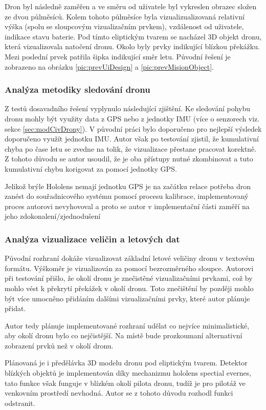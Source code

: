 Dron byl následně zaměřen a ve směru od uživatele byl vykreslen obrazec složen ze dvou půlměsíců. Kolem tohoto půlměsíce byla vizualizualizovaná relativní výška (spolu se sloupcovým vizualizačním prvkem), vzdálenost od uživatele, indikace stavu baterie. Pod tímto eliptickým tvarem se nacházel 3D objekt dronu, která vizualizovala natočení dronu. Okolo byly prvky indikující blízkou překážku. Mezi poslední prvek patřila šipka indikující směr letu. Původní řešení je zobrazeno na obrázku \ref{pic:prevUiDesign} a \ref{pic:prevMisionObject}.

\subsubsection{Analýza metodiky sledování dronu}
Z testů dosavadního řešení vyplynulo následující zjištění. Ke sledování pohybu dronu mohly být využity data z GPS nebo z jednotky IMU (více o senzorech viz. sekce \ref{sec:modCivDrony}). V původní práci bylo doporučeno pro nejlepší výsledek doporučeno využít jednotku IMU. Autor však po testování zjistil, že kumulativní chyba po čase letu se zvedne na tolik, že vizualizace přestane pracovat korektně. Z tohoto důvodu se autor usoudil, že je oba přístupy nutné zkombinovat a tuto kumulativní chybu korigovat za pomocí jednotky GPS.

Jelikož brýle Hololens nemají jednotku GPS je na začátku relace potřeba dron zanést do souřadnicového systému pomocí procesu kalibrace, implementovaný proces autorovi nevyhovoval a proto se autor v implementační části zaměří na jeho zdokonalení/zjednodušení
\subsubsection{Analýza  vizualizace veličin a letových dat}
Původní rozhraní dokáže vizualizovat základní letové veličiny dronu v textovém formátu. Výškoměr je vizualizován za pomocí bezrozměrného sloupce. Autorovi při testování přišlo, že okolí dronu je znečistěné vizualizačními prvkami, což by mohlo vést k překrytí překážek v okolí dronu. Toto znečištění by později mohlo být více umocněno přidáním dalšími vizualizačními prvky, které autor plánuje přidat. 

Autor tedy plánuje implementované rozhraní udělat co nejvíce minimalistické, aby okolí dronu bylo co nejčistější.  Na místě bude prozkoumaní alternativní zobrazení prvků než  v okolí dronu. 

Plánovaná je i předělávka 3D modelu dronu pod eliptickým tvarem. Detektor blízkých objektů je implementován díky mechanizmu hololens spectial evernes, tato funkce však funguje v blízkém okolí pilota dronu, tudíž je pro pilotáž ve venkovním prostředí nevhodná. Autor se z tohoto důvodu rozhodl funkci odstranit. 

